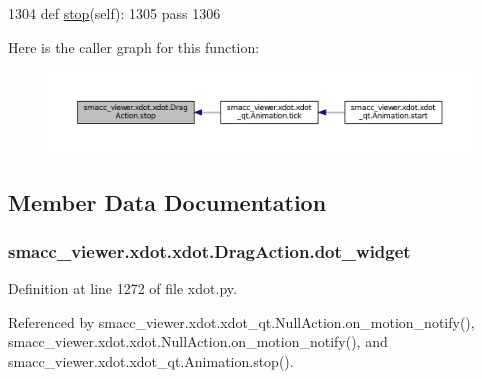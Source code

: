 \begin{DoxyCode}
1304     \textcolor{keyword}{def }\hyperlink{classsmacc__viewer_1_1xdot_1_1xdot_1_1DragAction_a013d589d9067a8b234700805fc2178ca}{stop}(self):
1305         \textcolor{keywordflow}{pass}
1306 
\end{DoxyCode}


Here is the caller graph for this function\+:
\nopagebreak
\begin{figure}[H]
\begin{center}
\leavevmode
\includegraphics[width=350pt]{classsmacc__viewer_1_1xdot_1_1xdot_1_1DragAction_a013d589d9067a8b234700805fc2178ca_icgraph}
\end{center}
\end{figure}




\subsection{Member Data Documentation}
\subsubsection[{\texorpdfstring{dot\+\_\+widget}{dot_widget}}]{\setlength{\rightskip}{0pt plus 5cm}smacc\+\_\+viewer.\+xdot.\+xdot.\+Drag\+Action.\+dot\+\_\+widget}\hypertarget{classsmacc__viewer_1_1xdot_1_1xdot_1_1DragAction_afbd8271575b937b6d47a89a7de5fc186}{}\label{classsmacc__viewer_1_1xdot_1_1xdot_1_1DragAction_afbd8271575b937b6d47a89a7de5fc186}


Definition at line 1272 of file xdot.\+py.



Referenced by smacc\+\_\+viewer.\+xdot.\+xdot\+\_\+qt.\+Null\+Action.\+on\+\_\+motion\+\_\+notify(), smacc\+\_\+viewer.\+xdot.\+xdot.\+Null\+Action.\+on\+\_\+motion\+\_\+notify(), and smacc\+\_\+viewer.\+xdot.\+xdot\+\_\+qt.\+Animation.\+stop().

